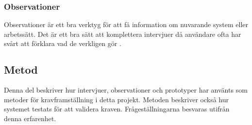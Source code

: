 \subsubsection{Observationer}
Observationer är ett bra verktyg för att få information om nuvarande system eller arbetssätt. Det är ett bra sätt att komplettera intervjuer då användare ofta har svårt att förklara vad de verkligen gör \cite{Lauesen}. 
 
\subsection{Metod}
Denna del beskriver hur intervjuer, observationer och prototyper har använts som metoder för kravframställning i detta projekt. Metoden beskriver också hur systemet testats för att validera kraven. Frågeställningarna besvaras utifrån denna erfarenhet.
